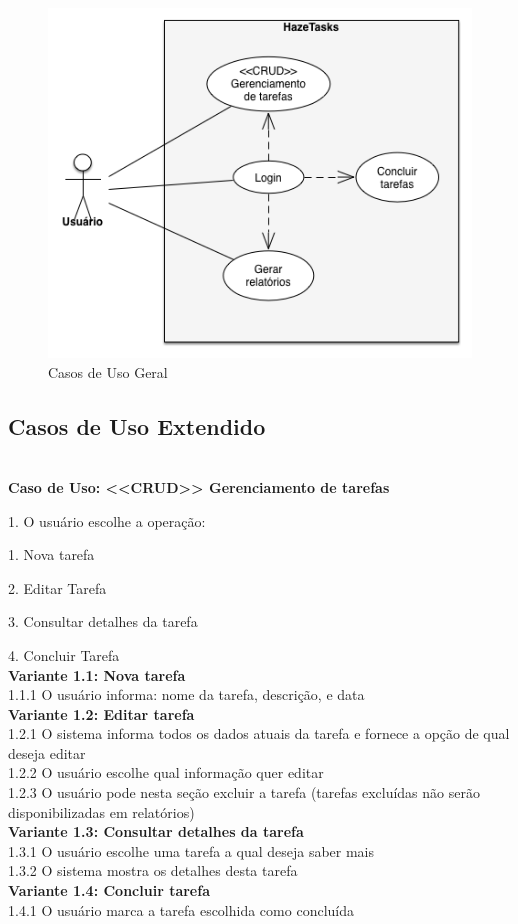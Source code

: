 \documentclass[a4paper, 12pt]{article}
\begin{document}
	\begin{figure}[H]
		\centering
		\includegraphics[scale=0.6]{usecase.png}
		\caption{Casos de Uso Geral}
	\end{figure}
	
	\subsection{Casos de Uso Extendido}
	
	\noindent \\\textbf{Caso de Uso: <<CRUD>> Gerenciamento de tarefas}
	
	1. O usuário escolhe a operação:
	
	1. Nova tarefa
	
	2. Editar Tarefa
	
	3. Consultar detalhes da tarefa
	
	4. Concluir Tarefa\\
	\textbf{Variante 1.1: Nova tarefa}\\
	1.1.1 O usuário informa: nome da tarefa, descrição, e data\\
	\textbf{Variante 1.2: Editar tarefa}\\
	1.2.1 O sistema informa todos os dados atuais da tarefa e fornece a opção de qual deseja editar\\
	1.2.2 O usuário escolhe qual informação quer editar\\
	1.2.3 O usuário pode nesta seção excluir a tarefa (tarefas excluídas não serão disponibilizadas em relatórios) \\
	\textbf{Variante 1.3: Consultar detalhes da tarefa}\\
	1.3.1 O usuário escolhe uma tarefa a qual deseja saber mais\\
	1.3.2 O sistema mostra os detalhes desta tarefa\\
	\textbf{Variante 1.4: Concluir tarefa}\\
	1.4.1 O usuário marca a tarefa escolhida como concluída\\
	
\end{document}
